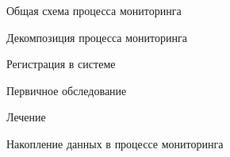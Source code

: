 
\begin{figure}[h]
\caption{Общая схема процесса мониторинга}
\label{app:tobe_main}
\end{figure}

\newpage \begin{figure}[h]
\caption{Декомпозиция процесса мониторинга}
\label{app:tobe_decomposition}
\end{figure}

\newpage \begin{figure}[h]
\caption{Регистрация в системе}
\label{app:tobe_registration}
\end{figure}

\newpage \begin{figure}[h]
\caption{Первичное обследование}
\label{app:tobe_first_appointment}
\end{figure}

\newpage \begin{figure}[h]
\caption{Лечение}
\label{app:tobe_repaire}
\end{figure}

\newpage \begin{figure}[h]
\caption{Накопление данных в процессе мониторинга}
\label{app:tobe_collect_metrics}
\end{figure}